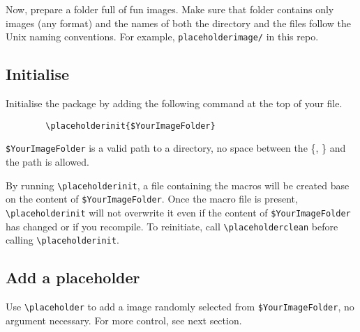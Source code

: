 \documentclass[12pt]{article}
\begin{document}
    Now, prepare a folder full of fun images. Make sure that folder contains only images (any format) and the names of both the directory and the files follow the Unix naming conventions. For example, \lstinline{placeholderimage/} in this repo.

    \subsection{Initialise}
    Initialise the package by adding the following command at the top of your file.
    \begin{lstlisting}        
        \placeholderinit{$YourImageFolder}
    \end{lstlisting}
    \lstinline{$YourImageFolder} is a valid path to a directory, no space between the \{, \} and the path is allowed.
    
    By running \lstinline{\placeholderinit}, a file containing the macros will be created base on the content of \lstinline{$YourImageFolder}. 
    Once the macro file is present, \lstinline{\placeholderinit} will not overwrite it even if the content of \lstinline{$YourImageFolder} has changed or if you recompile. 
    To reinitiate, call \lstinline{\placeholderclean} before calling \lstinline{\placeholderinit}.

    \subsection{Add a placeholder}
    Use \lstinline{\placeholder} to add a image randomly selected from \lstinline{$YourImageFolder}, no argument necessary. 
    For more control, see next section.
\end{document}
